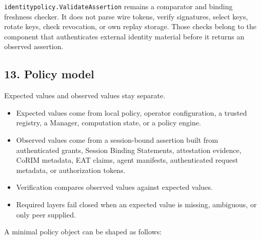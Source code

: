 \documentclass[
]{article}
\providecommand{\tightlist}{%
  \setlength{\itemsep}{0pt}\setlength{\parskip}{0pt}}
\begin{document}
\texttt{identitypolicy.ValidateAssertion} remains a comparator and
binding freshness checker. It does not parse wire tokens, verify
signatures, select keys, rotate keys, check revocation, or own replay
storage. Those checks belong to the component that authenticates
external identity material before it returns an observed assertion.

\subsection{13. Policy model}\label{policy-model}

Expected values and observed values stay separate.

\begin{itemize}
\tightlist
\item
  Expected values come from local policy, operator configuration, a
  trusted registry, a Manager, computation state, or a policy engine.
\item
  Observed values come from a session-bound assertion built from
  authenticated grants, Session Binding Statements, attestation
  evidence, CoRIM metadata, EAT claims, agent manifests, authenticated
  request metadata, or authorization tokens.
\item
  Verification compares observed values against expected values.
\item
  Required layers fail closed when an expected value is missing,
  ambiguous, or only peer supplied.
\end{itemize}

A minimal policy object can be shaped as follows:
\end{document}
